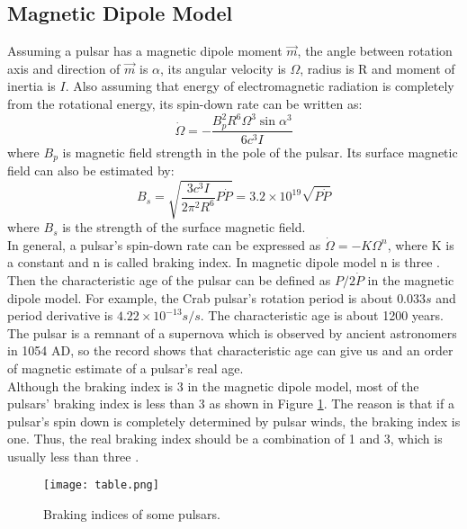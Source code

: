 \documentclass[a4paper, 12pt]{report}
\begin{document}
    \subsection{Magnetic Dipole Model}
      Assuming a pulsar has a magnetic dipole moment $\vec{m}$, the angle between rotation axis and 
      direction of 
      $\vec{m}$ is $\alpha$, its angular velocity is $\Omega$, radius is R and moment of inertia is $I$. 
      Also assuming that energy of electromagnetic radiation is completely from the rotational energy, 
      its spin-down rate can be written as: 
      $$
          \dot{\Omega}=-\frac{B_p^2 R^6 \Omega^3 \sin{\alpha}^3}{6c^3I}
      $$
      where $B_p$ is magnetic field strength in the pole of the pulsar. Its surface magnetic field can 
      also be estimated by:
      $$
          B_s=\sqrt{\frac{3c^3I}{2\pi^2R^6}P\dot{P}}=3.2\times 10^{19}\sqrt{P\dot{P}}
      $$
      where $B_s$ is the strength of the surface magnetic field. \\
      \indent In general, a pulsar's spin-down rate can be expressed as $\dot{\Omega}=-K\Omega^{n}$, 
      where K is a constant and n is called braking index. In magnetic dipole model n is 
      three \citep{Tong2015}. Then the characteristic age of the pulsar can be 
      defined as $P/2\dot{P}$ in the magnetic dipole model. For example, the Crab 
      pulsar's rotation period is about $0.033s$ and period derivative is 
      $4.22\times 10^{-13}s/s$. The characteristic age is about 1200 years. The pulsar 
      is a remnant of a supernova which is observed by ancient astronomers in 1054 
      AD, so the record shows that characteristic age can give us and an order of magnetic 
      estimate of a pulsar's real age. \\
      \indent 
      Although the braking index is 3 in the magnetic dipole model, most of the pulsars' 
      braking index is less than 3 as shown in Figure \ref{fig:braking_index}. The reason is 
      that if a pulsar's spin down is completely determined by pulsar winds, the braking 
      index is one. Thus, the real braking index should be a combination of 1 and 3, which is usually 
      less than three \citep{PhysRevD.91.063007}.
        
      \begin{figure}[!ht]
        \centering
        \texttt{[image: table.png]}
        \caption{Braking indices of some pulsars.}
        \label{fig:braking_index}
      \end{figure}
  
\end{document}
